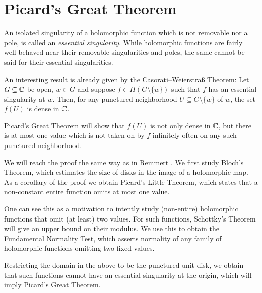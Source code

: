 \chapter{Picard's Great Theorem}
\label{ch:picards-great-theorem}

An isolated singularity of a holomorphic function which is not removable nor a pole, is called an \emph{essential singularity}. While holomorphic functions are fairly well-behaved near their removable singularities and poles, the same cannot be said for their essential singularities.

An interesting result is already given by the Casorati--Weierstraß Theorem: Let $G \subseteq \mathbb{C}$ be open, $w \in G$ and suppose $f \in H(G \setminus \{ w \})$ such that $f$ has an essential singularity at $w$. Then, for any punctured neighborhood $U \subseteq G \setminus \{ w \}$ of $w$, the set $f(U)$ is dense in $\mathbb{C}$.

Picard's Great Theorem will show that $f(U)$ is not only dense in $\mathbb{C}$, but there is at most one value which is not taken on by $f$ infinitely often on any such punctured neighborhood.

We will reach the proof the same way as in Remmert \cite{remmert-function-theory}. We first study Bloch's Theorem, which estimates the size of disks in the image of a holomorphic map. As a corollary of the proof we obtain Picard's Little Theorem, which states that a non-constant entire function omits at most one value.

One can see this as a motivation to intently study (non-entire) holomorphic functions that omit (at least) two values. For such functions, Schottky's Theorem will give an upper bound on their modulus. We use this to obtain the Fundamental Normality Test, which asserts normality of any family of holomorphic functions omitting two fixed values.

Restricting the domain in the above to be the punctured unit disk, we obtain that such functions cannot have an essential singularity at the origin, which will imply Picard's Great Theorem.




